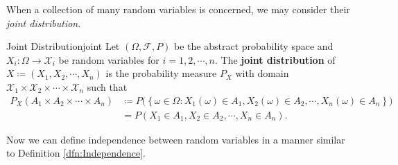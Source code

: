\documentclass[math]{amznotes}
\theoremstyle{remark}
\newcommand{\0}{\mathbf{0}}
\newcommand{\1}{\mathbf{1}}
\begin{document}
When a collection of many random variables is concerned, we may consider their \textit{joint distribution}.
\begin{dfnbox}{Joint Distribution}{joint}
    Let $\left(\Omega, \mathcal{F}, P\right)$ be the abstract probability space and $X_i \colon \Omega \to \mathcal{X}_i$ be random variables for $i = 1, 2, \cdots, n$. The {\color{red} \textbf{joint distribution}} of $X \coloneqq \left(X_1, X_2, \cdots, X_n\right)$ is the probability measure $P_{X}$ with domain $\mathcal{X}_1 \times \mathcal{X}_2 \times \cdots \times \mathcal{X}_n$ such that 
    \begin{align*}
        P_{X}\left(A_1 \times A_2 \times \cdots \times A_n\right) & \coloneqq P\bigl(\left\{\omega \in \Omega \colon X_1\left(\omega\right) \in A_1, X_2\left(\omega\right) \in A_2, \cdots, X_n\left(\omega\right) \in A_n\right\}\bigr) \\
        & = P\left(X_1 \in A_1, X_2 \in A_2, \cdots, X_n \in A_n\right).
    \end{align*}
\end{dfnbox}
Now we can define independence between random variables in a manner similar to Definition \ref{dfn:Independence}.
\end{document}
